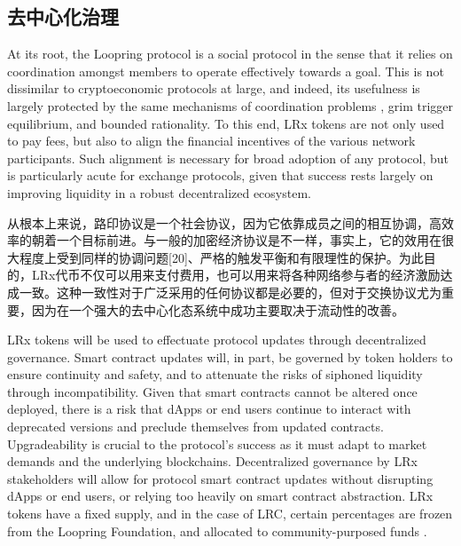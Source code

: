 \documentclass[UTF8,nofonts]{ctexart}
\begin{document}
\begin{multicols}{2}
\subsection{去中心化治理}
At its root, the Loopring protocol is a social protocol in the sense that it relies on coordination amongst members to operate effectively towards a goal. This is not dissimilar to cryptoeconomic protocols at large, and indeed, its usefulness is largely protected by the same mechanisms of coordination problems \cite{vitalikgovernance}, grim trigger equilibrium, and bounded rationality. To this end, LRx tokens are not only used to pay fees, but also to align the financial incentives of the various network participants. Such alignment is necessary for broad adoption of any protocol, but is particularly acute for exchange protocols, given that success rests largely on improving liquidity in a robust decentralized ecosystem.

从根本上来说，路印协议是一个社会协议，因为它依靠成员之间的相互协调，高效率的朝着一个目标前进。与一般的加密经济协议是不一样，事实上，它的效用在很大程度上受到同样的协调问题[20]、严格的触发平衡和有限理性的保护。为此目的，LRx代币不仅可以用来支付费用，也可以用来将各种网络参与者的经济激励达成一致。这种一致性对于广泛采用的任何协议都是必要的，但对于交换协议尤为重要，因为在一个强大的去中心化态系统中成功主要取决于流动性的改善。


LRx tokens will be used to effectuate protocol updates through decentralized governance. Smart contract updates will, in part, be governed by token holders to ensure continuity and safety, and to attenuate the risks of siphoned liquidity through incompatibility. Given that smart contracts cannot be altered once deployed, there is a risk that dApps or end users continue to interact with deprecated versions and preclude themselves from updated contracts. Upgradeability is crucial to the protocol's success as it must adapt to market demands and the underlying blockchains. Decentralized governance by LRx stakeholders will allow for protocol smart contract updates without disrupting dApps or end users, or relying too heavily on smart contract abstraction. LRx tokens have a fixed supply, and in the case of LRC, certain percentages are frozen from the Loopring Foundation, and allocated to community-purposed funds \cite{LRCtokendoc}.


\end{multicols}
\end{document}
